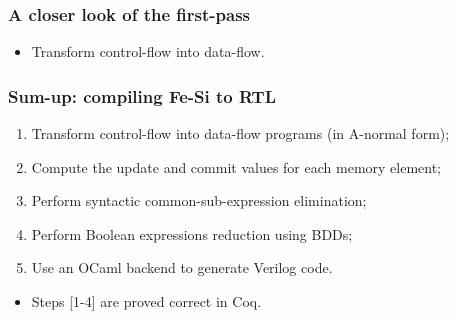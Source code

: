 \documentclass[9pt]{beamer}
\newcommand\fesi{Fe-Si}
\begin{document}
\begin{frame}
  \frametitle{A closer look of the first-pass}
  
  \begin{itemize}
  \item Transform control-flow into data-flow.
  \end{itemize}



\end{frame}

\begin{frame}[fragile]
  \frametitle{Sum-up: compiling \fesi{} to RTL}
  
  \begin{enumerate}
  \item Transform control-flow into data-flow programs (in A-normal form);
  \item Compute the update and commit values for each memory
    element;
  \item Perform syntactic common-sub-expression elimination;
  \item Perform Boolean expressions reduction using BDDs;
  \item Use an OCaml backend to generate Verilog code.
  \end{enumerate}

  \pause

  \begin{itemize}
  \item Steps [1-4] are proved correct in Coq.
  \end{itemize}
\end{frame}
\end{document}
